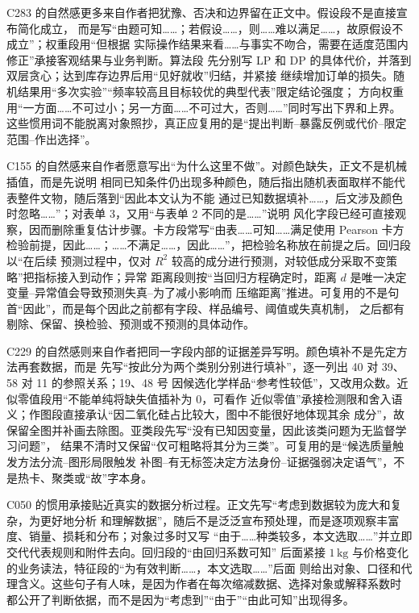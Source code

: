 C283 的自然感更多来自作者把犹豫、否决和边界留在正文中。假设段不是直接宣布简化成立，
而是写“由题可知……；若假设……，则……难以满足……，故原假设不成立”；权重段用“但根据
实际操作结果来看……与事实不吻合，需要在适度范围内修正”承接客观结果与业务判断。算法段
先分别写 LP 和 DP 的具体代价，并落到双层贪心；达到库存边界后用“见好就收”归结，并紧接
继续增加订单的损失。随机结果用“多次实验”“频率较高且目标较优的典型代表”限定结论强度；
方向权重用“一方面……不可过小；另一方面……不可过大，否则……”同时写出下界和上界。
这些惯用词不能脱离对象照抄，真正应复用的是“提出判断--暴露反例或代价--限定范围--作出选择”。

C155 的自然感来自作者愿意写出“为什么这里不做”。对颜色缺失，正文不是机械插值，而是先说明
相同已知条件仍出现多种颜色，随后指出随机表面取样不能代表整件文物，随后落到“因此本文认为不能
通过已知数据填补……，后文涉及颜色时忽略……”；对表单 3，又用“与表单 2 不同的是……”说明
风化字段已经可直接观察，因而删除重复估计步骤。卡方段常写“由表……可知……满足使用 Pearson
卡方检验前提，因此……；……不满足……，因此……”，把检验名称放在前提之后。回归段以“在后续
预测过程中，仅对 $R^2$ 较高的成分进行预测，对较低成分采取不变策略”把指标接入到动作；异常
距离段则按“当回归方程确定时，距离 $d$ 是唯一决定变量--异常值会导致预测失真--为了减小影响而
压缩距离”推进。可复用的不是句首“因此”，而是每个因此之前都有字段、样品编号、阈值或失真机制，
之后都有剔除、保留、换检验、预测或不预测的具体动作。

C229 的自然感则来自作者把同一字段内部的证据差异写明。颜色填补不是先定方法再套数据，而是
先写“按此分为两个类别分别进行填补”，逐一列出 40 对 39、58 对 11 的参照关系；19、48 号
因候选化学样品“参考性较低”，又改用众数。近似零值段用“不能单纯将缺失值插补为 0，可看作
近似零值”承接检测限和舍入语义；作图段直接承认“因二氧化硅占比较大，图中不能很好地体现其余
成分”，故保留全图并补画去除图。亚类段先写“没有已知因变量，因此该类问题为无监督学习问题”，
结果不清时又保留“仅可粗略将其分为三类”。可复用的是“候选质量触发方法分流--图形局限触发
补图--有无标签决定方法身份--证据强弱决定语气”，不是热卡、聚类或“故”字本身。

C050 的惯用承接贴近真实的数据分析过程。正文先写“考虑到数据较为庞大和复杂，为更好地分析
和理解数据”，随后不是泛泛宣布预处理，而是逐项观察丰富度、销量、损耗和分布；对象过多时又写
“由于……种类较多，本文选取……”并立即交代代表规则和附件去向。回归段的“由回归系数可知”
后面紧接 $1\,\mathrm{kg}$ 与价格变化的业务读法，特征段的“为有效判断……，本文选取……”后面
则给出对象、口径和代理含义。这些句子有人味，是因为作者在每次缩减数据、选择对象或解释系数时
都公开了判断依据，而不是因为“考虑到”“由于”“由此可知”出现得多。

